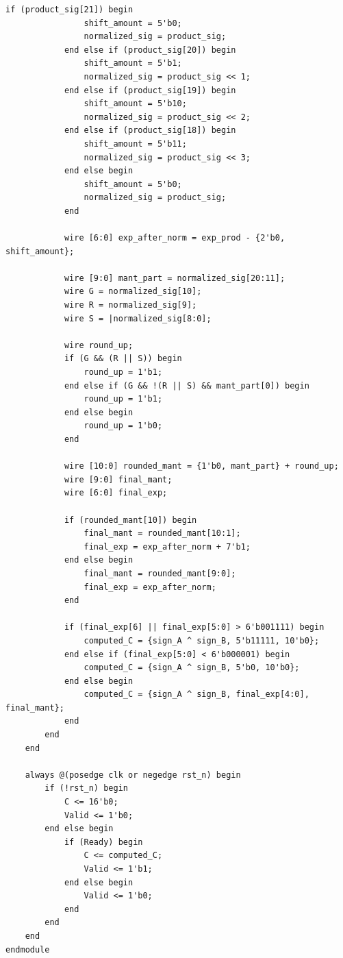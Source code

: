 \documentclass[UTF8]{ctexart}
\begin{document}
\begin{lstlisting}[frame=shadowbox,caption=vRTL251119112055\_473.v]
            if (product_sig[21]) begin
                shift_amount = 5'b0;
                normalized_sig = product_sig;
            end else if (product_sig[20]) begin
                shift_amount = 5'b1;
                normalized_sig = product_sig << 1;
            end else if (product_sig[19]) begin
                shift_amount = 5'b10;
                normalized_sig = product_sig << 2;
            end else if (product_sig[18]) begin
                shift_amount = 5'b11;
                normalized_sig = product_sig << 3;
            end else begin
                shift_amount = 5'b0;
                normalized_sig = product_sig;
            end

            wire [6:0] exp_after_norm = exp_prod - {2'b0, shift_amount};

            wire [9:0] mant_part = normalized_sig[20:11];
            wire G = normalized_sig[10];
            wire R = normalized_sig[9];
            wire S = |normalized_sig[8:0];

            wire round_up;
            if (G && (R || S)) begin
                round_up = 1'b1;
            end else if (G && !(R || S) && mant_part[0]) begin
                round_up = 1'b1;
            end else begin
                round_up = 1'b0;
            end

            wire [10:0] rounded_mant = {1'b0, mant_part} + round_up;
            wire [9:0] final_mant;
            wire [6:0] final_exp;
            
            if (rounded_mant[10]) begin
                final_mant = rounded_mant[10:1];
                final_exp = exp_after_norm + 7'b1;
            end else begin
                final_mant = rounded_mant[9:0];
                final_exp = exp_after_norm;
            end

            if (final_exp[6] || final_exp[5:0] > 6'b001111) begin
                computed_C = {sign_A ^ sign_B, 5'b11111, 10'b0};
            end else if (final_exp[5:0] < 6'b000001) begin
                computed_C = {sign_A ^ sign_B, 5'b0, 10'b0};
            end else begin
                computed_C = {sign_A ^ sign_B, final_exp[4:0], final_mant};
            end
        end
    end

    always @(posedge clk or negedge rst_n) begin
        if (!rst_n) begin
            C <= 16'b0;
            Valid <= 1'b0;
        end else begin
            if (Ready) begin
                C <= computed_C;
                Valid <= 1'b1;
            end else begin
                Valid <= 1'b0;
            end
        end
    end
endmodule 
\end{lstlisting}
\end{document}

